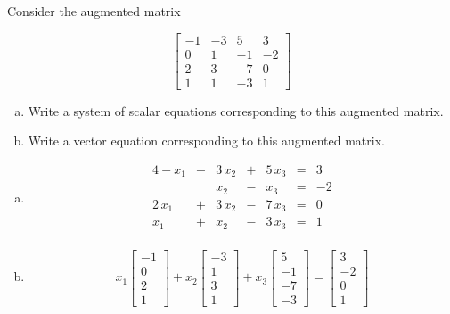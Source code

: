 
\begin{exerciseStatement}


 Consider the augmented matrix 

\[ \left[\begin{array}{ccc|c}
-1 & -3 & 5 & 3 \\
0 & 1 & -1 & -2 \\
2 & 3 & -7 & 0 \\
1 & 1 & -3 & 1
\end{array}\right] \]
\begin{enumerate}[(a)]
\item  Write a system of scalar equations corresponding to this augmented matrix. 
\item  Write a vector equation corresponding to this augmented matrix. 
\end{enumerate}
    
\end{exerciseStatement}
    
\begin{exerciseAnswer} 

\begin{enumerate}[(a)]
\item 
\begin{alignat*}{4} -x_{1} &-& 3 \, x_{2} &+& 5 \, x_{3} &=& 3 \\ & & x_{2} &-& x_{3} &=& -2 \\2 \, x_{1} &+& 3 \, x_{2} &-& 7 \, x_{3} &=& 0 \\x_{1} &+& x_{2} &-& 3 \, x_{3} &=& 1 \\ \end{alignat*}
            
\item \[ x_{1} \left[\begin{array}{c}
-1 \\
0 \\
2 \\
1
\end{array}\right] + x_{2} \left[\begin{array}{c}
-3 \\
1 \\
3 \\
1
\end{array}\right] + x_{3} \left[\begin{array}{c}
5 \\
-1 \\
-7 \\
-3
\end{array}\right] = \left[\begin{array}{c}
3 \\
-2 \\
0 \\
1
\end{array}\right] \]
\end{enumerate}
    
\end{exerciseAnswer}
    
